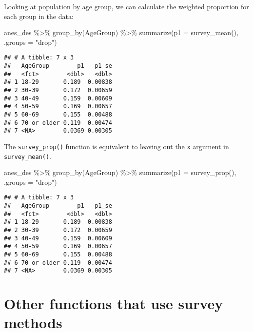 \documentclass[
]{krantz}
\makeatletter
\newenvironment{Shaded}{\begin{snugshade}}{\end{snugshade}}
\newcommand{\AttributeTok}[1]{\textcolor[rgb]{0.61,0.61,0.61}{#1}}
\newcommand{\FunctionTok}[1]{\textcolor[rgb]{0,0,0}{#1}}
\newcommand{\NormalTok}[1]{#1}
\newcommand{\SpecialCharTok}[1]{\textcolor[rgb]{0,0,0}{#1}}
\newcommand{\StringTok}[1]{\textcolor[rgb]{0.5,0.5,0.5}{#1}}
\newenvironment{kframe}{%
\medskip{}
\setlength{\fboxsep}{.8em}
 \def\at@end@of@kframe{}%
 \ifinner\ifhmode%
  \def\at@end@of@kframe{\end{minipage}}%
  \begin{minipage}{\columnwidth}%
 \fi\fi%
 \def\FrameCommand##1{\hskip\@totalleftmargin \hskip-\fboxsep
 \colorbox{shadecolor}{##1}\hskip-\fboxsep
     \hskip-\linewidth \hskip-\@totalleftmargin \hskip\columnwidth}%
 \MakeFramed {\advance\hsize-\width
   \@totalleftmargin\z@ \linewidth\hsize
   \@setminipage}}%
 {\par\unskip\endMakeFramed%
 \at@end@of@kframe}
\renewenvironment{Shaded}{\begin{kframe}}{\end{kframe}}
\makeatother
\begin{document}
Looking at population by age group, we can calculate the weighted proportion for each group in the data:

\begin{Shaded}
\begin{Highlighting}[]
\NormalTok{anes\_des }\SpecialCharTok{\%\textgreater{}\%}
  \FunctionTok{group\_by}\NormalTok{(AgeGroup) }\SpecialCharTok{\%\textgreater{}\%}
  \FunctionTok{summarize}\NormalTok{(}\AttributeTok{p1 =} \FunctionTok{survey\_mean}\NormalTok{(),}
            \AttributeTok{.groups =} \StringTok{"drop"}\NormalTok{)}
\end{Highlighting}
\end{Shaded}

\begin{verbatim}
## # A tibble: 7 x 3
##   AgeGroup        p1   p1_se
##   <fct>        <dbl>   <dbl>
## 1 18-29       0.189  0.00838
## 2 30-39       0.172  0.00659
## 3 40-49       0.159  0.00609
## 4 50-59       0.169  0.00657
## 5 60-69       0.155  0.00488
## 6 70 or older 0.119  0.00474
## 7 <NA>        0.0369 0.00305
\end{verbatim}

The \texttt{survey\_prop()} function is equivalent to leaving out the \texttt{x} argument in \texttt{survey\_mean()}.

\begin{Shaded}
\begin{Highlighting}[]
\NormalTok{anes\_des }\SpecialCharTok{\%\textgreater{}\%}
  \FunctionTok{group\_by}\NormalTok{(AgeGroup) }\SpecialCharTok{\%\textgreater{}\%}
  \FunctionTok{summarize}\NormalTok{(}\AttributeTok{p1 =} \FunctionTok{survey\_prop}\NormalTok{(),}
            \AttributeTok{.groups =} \StringTok{"drop"}\NormalTok{)}
\end{Highlighting}
\end{Shaded}

\begin{verbatim}
## # A tibble: 7 x 3
##   AgeGroup        p1   p1_se
##   <fct>        <dbl>   <dbl>
## 1 18-29       0.189  0.00838
## 2 30-39       0.172  0.00659
## 3 40-49       0.159  0.00609
## 4 50-59       0.169  0.00657
## 5 60-69       0.155  0.00488
## 6 70 or older 0.119  0.00474
## 7 <NA>        0.0369 0.00305
\end{verbatim}

\hypertarget{other-functions-that-use-survey-methods}{%
\section{Other functions that use survey methods}\label{other-functions-that-use-survey-methods}}
\end{document}
